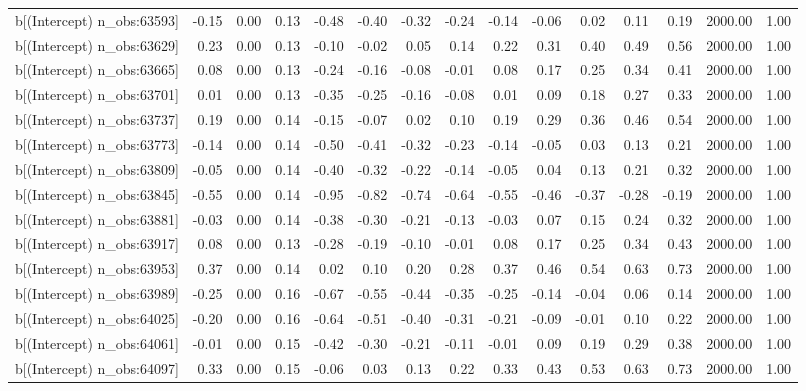 \begin{table}[ht]
\begin{tabular}{rrrrrrrrrrrrrrr}
  b[(Intercept) n\_obs:63593] & -0.15 & 0.00 & 0.13 & -0.48 & -0.40 & -0.32 & -0.24 & -0.14 & -0.06 & 0.02 & 0.11 & 0.19 & 2000.00 & 1.00 \\ 
  b[(Intercept) n\_obs:63629] & 0.23 & 0.00 & 0.13 & -0.10 & -0.02 & 0.05 & 0.14 & 0.22 & 0.31 & 0.40 & 0.49 & 0.56 & 2000.00 & 1.00 \\ 
  b[(Intercept) n\_obs:63665] & 0.08 & 0.00 & 0.13 & -0.24 & -0.16 & -0.08 & -0.01 & 0.08 & 0.17 & 0.25 & 0.34 & 0.41 & 2000.00 & 1.00 \\ 
  b[(Intercept) n\_obs:63701] & 0.01 & 0.00 & 0.13 & -0.35 & -0.25 & -0.16 & -0.08 & 0.01 & 0.09 & 0.18 & 0.27 & 0.33 & 2000.00 & 1.00 \\ 
  b[(Intercept) n\_obs:63737] & 0.19 & 0.00 & 0.14 & -0.15 & -0.07 & 0.02 & 0.10 & 0.19 & 0.29 & 0.36 & 0.46 & 0.54 & 2000.00 & 1.00 \\ 
  b[(Intercept) n\_obs:63773] & -0.14 & 0.00 & 0.14 & -0.50 & -0.41 & -0.32 & -0.23 & -0.14 & -0.05 & 0.03 & 0.13 & 0.21 & 2000.00 & 1.00 \\ 
  b[(Intercept) n\_obs:63809] & -0.05 & 0.00 & 0.14 & -0.40 & -0.32 & -0.22 & -0.14 & -0.05 & 0.04 & 0.13 & 0.21 & 0.32 & 2000.00 & 1.00 \\ 
  b[(Intercept) n\_obs:63845] & -0.55 & 0.00 & 0.14 & -0.95 & -0.82 & -0.74 & -0.64 & -0.55 & -0.46 & -0.37 & -0.28 & -0.19 & 2000.00 & 1.00 \\ 
  b[(Intercept) n\_obs:63881] & -0.03 & 0.00 & 0.14 & -0.38 & -0.30 & -0.21 & -0.13 & -0.03 & 0.07 & 0.15 & 0.24 & 0.32 & 2000.00 & 1.00 \\ 
  b[(Intercept) n\_obs:63917] & 0.08 & 0.00 & 0.13 & -0.28 & -0.19 & -0.10 & -0.01 & 0.08 & 0.17 & 0.25 & 0.34 & 0.43 & 2000.00 & 1.00 \\ 
  b[(Intercept) n\_obs:63953] & 0.37 & 0.00 & 0.14 & 0.02 & 0.10 & 0.20 & 0.28 & 0.37 & 0.46 & 0.54 & 0.63 & 0.73 & 2000.00 & 1.00 \\ 
  b[(Intercept) n\_obs:63989] & -0.25 & 0.00 & 0.16 & -0.67 & -0.55 & -0.44 & -0.35 & -0.25 & -0.14 & -0.04 & 0.06 & 0.14 & 2000.00 & 1.00 \\ 
  b[(Intercept) n\_obs:64025] & -0.20 & 0.00 & 0.16 & -0.64 & -0.51 & -0.40 & -0.31 & -0.21 & -0.09 & -0.01 & 0.10 & 0.22 & 2000.00 & 1.00 \\ 
  b[(Intercept) n\_obs:64061] & -0.01 & 0.00 & 0.15 & -0.42 & -0.30 & -0.21 & -0.11 & -0.01 & 0.09 & 0.19 & 0.29 & 0.38 & 2000.00 & 1.00 \\ 
  b[(Intercept) n\_obs:64097] & 0.33 & 0.00 & 0.15 & -0.06 & 0.03 & 0.13 & 0.22 & 0.33 & 0.43 & 0.53 & 0.63 & 0.73 & 2000.00 & 1.00 \\ 

\end{tabular}
\end{table}
